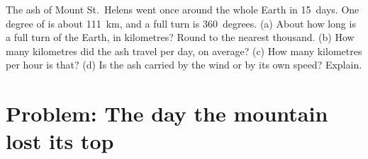 \begin{exercise}[$\star\star\star$]\label{exo:g7:volcanoes:12}
The ash of Mount St.~Helens went once around the whole Earth in 15~days.
One degree of  is about \qty{111}{km}, and a full turn is
360~degrees. (a) About how long is a full turn of the Earth, in
kilometres? Round to the nearest thousand. (b) How many kilometres did
the ash travel per day, on average? (c) How many kilometres per hour is
that? (d) Is the ash carried by the wind or by its own speed? Explain.
\end{exercise}

\section{Problem: The day the mountain lost its top}

